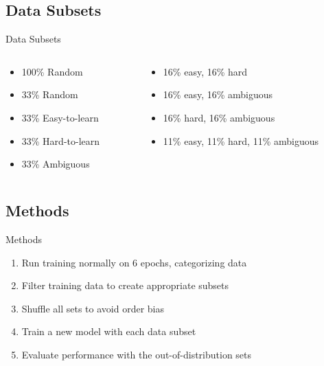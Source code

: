 \documentclass[
	11pt,
]{beamer}
\begin{document}
\subsection{Data Subsets}
\begin{frame}{Data Subsets}
	\begin{columns}
		\begin{column}{.4\textwidth}
			\begin{itemize}
				\item 100\% Random
				\item  33\% Random
				      \vspace{1cm}
				\item 33\% Easy-to-learn
				\item 33\% Hard-to-learn
				\item 33\% Ambiguous
			\end{itemize}
		\end{column}
		\begin{column}{.6\textwidth}
			\begin{itemize}
				\fontsize{11pt}{20pt}\selectfont
				\item 16\% easy, 16\% hard
				\item 16\% easy, 16\% ambiguous
				\item 16\% hard, 16\% ambiguous
				\item 11\% easy, 11\% hard, 11\% ambiguous
			\end{itemize}

		\end{column}
	\end{columns}
\end{frame}


\subsection{Methods}
\begin{frame}[t]{Methods}
	\vspace{.5cm}
	\begin{enumerate}
		\fontsize{11pt}{20pt}\selectfont
		\item Run training normally on 6 epochs, categorizing data
		\item Filter training data to create appropriate subsets
		\item Shuffle all sets to avoid order bias
		\item Train a new model with each data subset
		\item Evaluate performance with the out-of-distribution sets
	\end{enumerate}
\end{frame}
\end{document}
